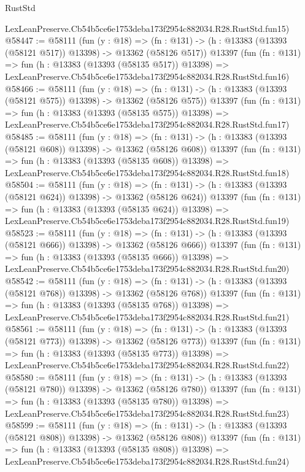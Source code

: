 \begin{lexlean}{RustStd}
\begin{coremodule}
    LexLeanPreserve.Cb54b5ce6e1753deba173f2954c882034.R28.RustStd.fun15)
@58447 := @58111
    (fun (y : @18) =>
    (fn : @131) -> (h : @13383 (@13393 (@58121 @517)) @13398) -> @13362 (@58126 @517))
    @13397
    (fun (fn : @131) =>
    fun (h : @13383 (@13393 (@58135 @517)) @13398) =>
    LexLeanPreserve.Cb54b5ce6e1753deba173f2954c882034.R28.RustStd.fun16)
@58466 := @58111
    (fun (y : @18) =>
    (fn : @131) -> (h : @13383 (@13393 (@58121 @575)) @13398) -> @13362 (@58126 @575))
    @13397
    (fun (fn : @131) =>
    fun (h : @13383 (@13393 (@58135 @575)) @13398) =>
    LexLeanPreserve.Cb54b5ce6e1753deba173f2954c882034.R28.RustStd.fun17)
@58485 := @58111
    (fun (y : @18) =>
    (fn : @131) -> (h : @13383 (@13393 (@58121 @608)) @13398) -> @13362 (@58126 @608))
    @13397
    (fun (fn : @131) =>
    fun (h : @13383 (@13393 (@58135 @608)) @13398) =>
    LexLeanPreserve.Cb54b5ce6e1753deba173f2954c882034.R28.RustStd.fun18)
@58504 := @58111
    (fun (y : @18) =>
    (fn : @131) -> (h : @13383 (@13393 (@58121 @624)) @13398) -> @13362 (@58126 @624))
    @13397
    (fun (fn : @131) =>
    fun (h : @13383 (@13393 (@58135 @624)) @13398) =>
    LexLeanPreserve.Cb54b5ce6e1753deba173f2954c882034.R28.RustStd.fun19)
@58523 := @58111
    (fun (y : @18) =>
    (fn : @131) -> (h : @13383 (@13393 (@58121 @666)) @13398) -> @13362 (@58126 @666))
    @13397
    (fun (fn : @131) =>
    fun (h : @13383 (@13393 (@58135 @666)) @13398) =>
    LexLeanPreserve.Cb54b5ce6e1753deba173f2954c882034.R28.RustStd.fun20)
@58542 := @58111
    (fun (y : @18) =>
    (fn : @131) -> (h : @13383 (@13393 (@58121 @768)) @13398) -> @13362 (@58126 @768))
    @13397
    (fun (fn : @131) =>
    fun (h : @13383 (@13393 (@58135 @768)) @13398) =>
    LexLeanPreserve.Cb54b5ce6e1753deba173f2954c882034.R28.RustStd.fun21)
@58561 := @58111
    (fun (y : @18) =>
    (fn : @131) -> (h : @13383 (@13393 (@58121 @773)) @13398) -> @13362 (@58126 @773))
    @13397
    (fun (fn : @131) =>
    fun (h : @13383 (@13393 (@58135 @773)) @13398) =>
    LexLeanPreserve.Cb54b5ce6e1753deba173f2954c882034.R28.RustStd.fun22)
@58580 := @58111
    (fun (y : @18) =>
    (fn : @131) -> (h : @13383 (@13393 (@58121 @780)) @13398) -> @13362 (@58126 @780))
    @13397
    (fun (fn : @131) =>
    fun (h : @13383 (@13393 (@58135 @780)) @13398) =>
    LexLeanPreserve.Cb54b5ce6e1753deba173f2954c882034.R28.RustStd.fun23)
@58599 := @58111
    (fun (y : @18) =>
    (fn : @131) -> (h : @13383 (@13393 (@58121 @808)) @13398) -> @13362 (@58126 @808))
    @13397
    (fun (fn : @131) =>
    fun (h : @13383 (@13393 (@58135 @808)) @13398) =>
    LexLeanPreserve.Cb54b5ce6e1753deba173f2954c882034.R28.RustStd.fun24)

\end{coremodule}
\end{lexlean}
